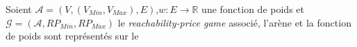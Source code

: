 
\begin{exemple}

	Soient $\mathcal{A} = (V, (V_{Min}, V_{Max}), E) $,$w: E \rightarrow \mathbb{R}$ une fonction de poids et $\mathcal{G} = (\mathcal{A},RP_{Min},RP_{Max})$ le \og \textit{reachability-price game} associé, l'arène et la fonction de poids sont représentés sur le %
\end{exemple}	 